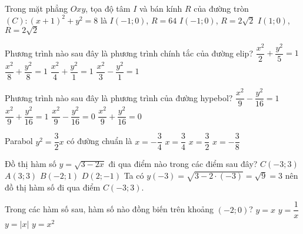 \begin{ex}%
	Trong mặt phẳng $O x y$, tọa độ tâm $I$ và bán kính $R$ của đường tròn
	$(C)\colon (x+1)^2+y^2=8$ là
	{$I(-1 ; 0)$, $R=64$}
	{\True $I(-1 ; 0)$, $R=2 \sqrt{2}$}
	{$I(1; 0)$, $R=2 \sqrt{2}$}
\end{ex}

\begin{ex}%
	Phương trình nào sau đây là phương trình chính tắc của đường elip?
	\choice
	{$\dfrac{x^2}{2}+\dfrac{y^2}{5}=1$}
	{$\dfrac{x^2}{8}+\dfrac{y^2}{8}=1$}
	{\True $\dfrac{x^2}{4}+\dfrac{y^2}{1}=1$}
	{$\dfrac{x^2}{3}-\dfrac{y^2}{1}=1$}
\end{ex}

\begin{ex}%
	Phương trình nào sau đây là phương trình của đường hypebol?
	\choice
	{\True $\dfrac{x^2}{9} - \dfrac{y^2}{16} = 1$}
	{$\dfrac{x^2}{9} + \dfrac{y^2}{16} = 1$}
	{$\dfrac{x^2}{9} - \dfrac{y^2}{16} = 0$}
	{$\dfrac{x^2}{9} + \dfrac{y^2}{16} = 0$}
\end{ex}

\begin{ex}%
	Parabol $y^2=\dfrac{3}{2}x$ có đường chuẩn là
	\choice
	{$x=-\dfrac{3}{4}$}
	{$x=\dfrac{3}{4}$}
	{$x=\dfrac{3}{2}$}
	{\True $x=-\dfrac{3}{8}$}
\end{ex}

\begin{ex}%
	Đồ thị hàm số $y=\sqrt{3-2x}$ đi qua điểm nào trong các điểm sau đây?
	\choice
	{\True $C(-3;3)$}
	{$A(3;3)$}
	{$B(-2;1)$}
	{$D(2;-1)$}
	\loigiai
	{Ta có $y(-3)=\sqrt{3-2\cdot (-3)}=\sqrt{9}=3$ nên đồ thị hàm số đi qua điểm $C(-3;3)$.}
\end{ex}

\begin{ex}%
	Trong các hàm số sau, hàm số nào đồng biến trên khoảng $(-2;0)$?
	\choice
	{\True $y=x$}
	{$y=\dfrac{1}{x}$}
	{$y=|x|$}
	{$y=x^2$}
\end{ex}

